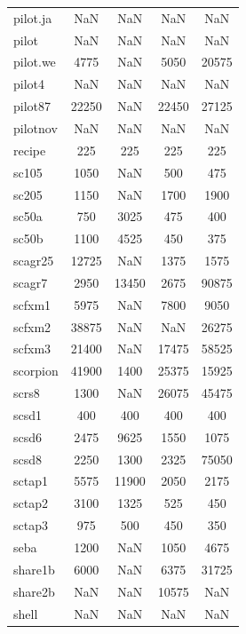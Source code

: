 \begin{longtable}{lcccc}
pilot.ja &      NaN &   NaN &      NaN &      NaN \\
pilot    &      NaN &   NaN &      NaN &      NaN \\
pilot.we &     4775 &   NaN &     5050 &    20575 \\
pilot4   &      NaN &   NaN &      NaN &      NaN \\
pilot87  &    22250 &   NaN &    22450 &    27125 \\
pilotnov &      NaN &   NaN &      NaN &      NaN \\
recipe   &      225 &   225 &      225 &      225 \\
sc105    &     1050 &   NaN &      500 &      475 \\
sc205    &     1150 &   NaN &     1700 &     1900 \\
sc50a    &      750 &  3025 &      475 &      400 \\
sc50b    &     1100 &  4525 &      450 &      375 \\
scagr25  &    12725 &   NaN &     1375 &     1575 \\
scagr7   &     2950 & 13450 &     2675 &    90875 \\
scfxm1   &     5975 &   NaN &     7800 &     9050 \\
scfxm2   &    38875 &   NaN &      NaN &    26275 \\
scfxm3   &    21400 &   NaN &    17475 &    58525 \\
scorpion &    41900 &  1400 &    25375 &    15925 \\
scrs8    &     1300 &   NaN &    26075 &    45475 \\
scsd1    &      400 &   400 &      400 &      400 \\
scsd6    &     2475 &  9625 &     1550 &     1075 \\
scsd8    &     2250 &  1300 &     2325 &    75050 \\
sctap1   &     5575 & 11900 &     2050 &     2175 \\
sctap2   &     3100 &  1325 &      525 &      450 \\
sctap3   &      975 &   500 &      450 &      350 \\
seba     &     1200 &   NaN &     1050 &     4675 \\
share1b  &     6000 &   NaN &     6375 &    31725 \\
share2b  &      NaN &   NaN &    10575 &      NaN \\
shell    &      NaN &   NaN &      NaN &      NaN \\

\end{longtable}
